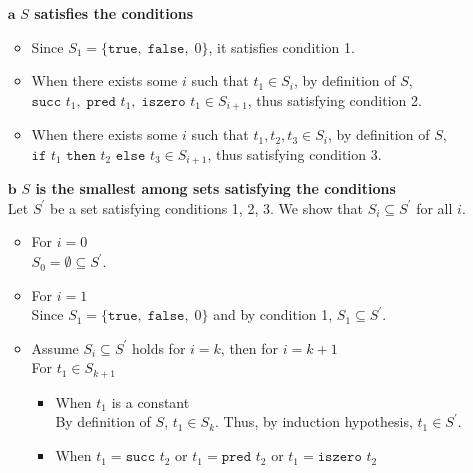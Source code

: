 \documentclass[a4paper,11pt,fleqn,dvipdfmx]{article}
\newcommand{\kakko}[1]{\raisebox{.2ex}{(}#1\raisebox{.2ex}{)}}
\begin{document}
        \begin{itemize}
            \item [\kakko{$\boldsymbol{a}$}] {\bf $S$ satisfies the conditions}
            \begin{itemize}
                \item Since $S_1 = \{\texttt{true}, \; \texttt{false}, \; 0\}$, it satisfies condition \kakko{1}.
                \item When there exists some $i$ such that $t_1 \in S_i$, by definition of $S$, \\
                    $\texttt{succ } t_1, \; \texttt{pred } t_1, \; \texttt{iszero } t_1 \in S_{i+1}$, thus satisfying condition \kakko{2}.
                \item When there exists some $i$ such that $t_1, t_2, t_3 \in S_i$, by definition of $S$, \\
                    $\texttt{if } t_1 \texttt{ then } t_2 \texttt{ else } t_3 \in S_{i+1}$, thus satisfying condition \kakko{3}.
            \end{itemize}
            \item [\kakko{$\boldsymbol{b}$}] {\bf $S$ is the smallest among sets satisfying the conditions} \\[2mm]
            Let $S^\prime$ be a set satisfying conditions \kakko{1}, \kakko{2}, \kakko{3}. We show that $S_i \subseteq S^\prime$ for all $i$.
            \begin{itemize}
                \item For $i=0$ \\[2mm]
                    $S_0 = \emptyset \subseteq S^\prime$.
                \item For $i=1$ \\[2mm]
                    Since $S_1 = \{\texttt{true}, \; \texttt{false}, \; 0\}$ and by condition \kakko{1}, $S_1 \subseteq S^\prime$.
                \item Assume $S_i \subseteq S^\prime$ holds for $i=k$, then for $i=k+1$ \\[2mm]
                    For $t_1 \in S_{k+1}$
                    \begin{itemize}
                        \item When $t_1$ is a constant \\[2mm]
                            By definition of $S$, $t_1 \in S_k$. Thus, by induction hypothesis, $t_1 \in S^\prime$.
                        \item When $t_1 = \texttt{succ } t_2$ or $t_1 = \texttt{pred } t_2$ or $t_1 = \texttt{iszero } t_2$ \\[2mm]

\end{itemize}
\end{itemize}
\end{itemize}
\end{document}
